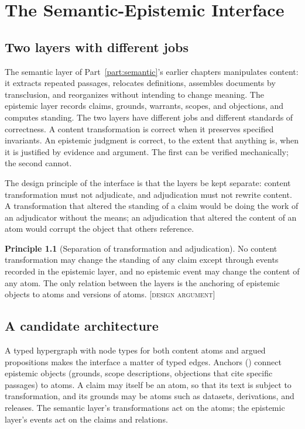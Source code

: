 \documentclass[11pt,twoside,openright]{book}
\theoremstyle{plain}
\theoremstyle{definition}
\newtheorem{principle}[theorem]{Principle}
\theoremstyle{remark}
\newcommand{\Design}{\textup{\textsc{[design argument]}}}
\begin{document}
\chapter{The Semantic-Epistemic Interface}\label{ch:interface}

\section{Two layers with different jobs}

The semantic layer of Part~\ref{part:semantic}'s earlier chapters manipulates content: it extracts repeated passages, relocates definitions, assembles documents by transclusion, and reorganizes without intending to change meaning. The epistemic layer records claims, grounds, warrants, scopes, and objections, and computes standing. The two layers have different jobs and different standards of correctness. A content transformation is correct when it preserves specified invariants. An epistemic judgment is correct, to the extent that anything is, when it is justified by evidence and argument. The first can be verified mechanically; the second cannot.

The design principle of the interface is that the layers be kept separate: content transformation must not adjudicate, and adjudication must not rewrite content. A transformation that altered the standing of a claim would be doing the work of an adjudicator without the means; an adjudication that altered the content of an atom would corrupt the object that others reference.

\begin{principle}[Separation of transformation and adjudication]\label{pr:separation}
No content transformation may change the standing of any claim except through events recorded in the epistemic layer, and no epistemic event may change the content of any atom. The only relation between the layers is the anchoring of epistemic objects to atoms and versions of atoms.
\Design{}
\end{principle}

\section{A candidate architecture}

A typed hypergraph with node types for both content atoms and argued propositions makes the interface a matter of typed edges. Anchors () connect epistemic objects (grounds, scope descriptions, objections that cite specific passages) to atoms. A claim may itself be an atom, so that its text is subject to transformation, and its grounds may be atoms such as datasets, derivations, and releases. The semantic layer's transformations act on the atoms; the epistemic layer's events act on the claims and relations.
\end{document}
